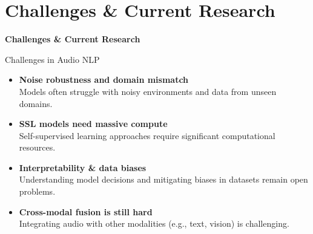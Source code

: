 \section{Challenges \& Current Research}

\begin{frame}{}
    \LARGE \textbf{Challenges \& Current Research}
\end{frame}

\begin{frame}{Challenges in Audio NLP}
    \begin{itemize}
        \setlength{\itemsep}{1.5em}
        \item \textbf{Noise robustness and domain mismatch} \\
        Models often struggle with noisy environments and data from unseen domains.
        \item \textbf{SSL models need massive compute} \\
        Self-supervised learning approaches require significant computational resources.
        \item \textbf{Interpretability \& data biases} \\
        Understanding model decisions and mitigating biases in datasets remain open problems.
        \item \textbf{Cross-modal fusion is still hard} \\
        Integrating audio with other modalities (e.g., text, vision) is challenging.
    \end{itemize}
\end{frame}